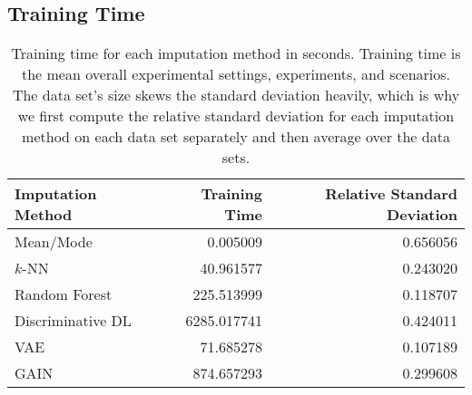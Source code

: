 \subsection{Training Time}

\begin{table}
	\centering
	\label{tab:time}
	\begin{tabular}{lrr}
		\toprule
		Imputation Method &  Training Time &  Relative Standard Deviation \\
		\midrule
		Mean/Mode &       0.005009 &                     0.656056 \\
		$k$-NN &      40.961577 &                     0.243020 \\
		Random Forest &     225.513999 &                     0.118707 \\
		Discriminative DL &    6285.017741 &                     0.424011 \\
		VAE &      71.685278 &                     0.107189 \\
		GAIN &     874.657293 &                     0.299608 \\
		\bottomrule
	\end{tabular}
	\caption{Training time for each imputation method in seconds. Training time is the mean overall experimental settings, experiments, and scenarios. The data set's size skews the standard deviation heavily, which is why we first compute the relative standard deviation for each imputation method on each data set separately and then average over the data sets.}
\end{table}
